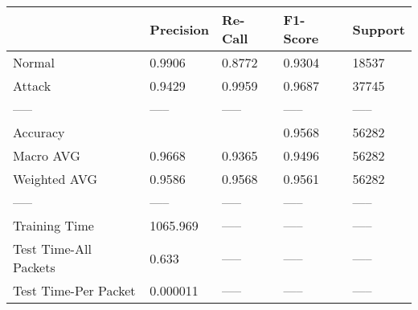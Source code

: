 \begin{tabular}{lllll}
\toprule
{} & Precision & Re-Call & F1-Score & Support \\
\midrule
Normal                &    0.9906 &  0.8772 &   0.9304 &   18537 \\
Attack                &    0.9429 &  0.9959 &   0.9687 &   37745 \\
-----                 &     ----- &   ----- &    ----- &   ----- \\
Accuracy              &           &         &   0.9568 &   56282 \\
Macro AVG             &    0.9668 &  0.9365 &   0.9496 &   56282 \\
Weighted AVG          &    0.9586 &  0.9568 &   0.9561 &   56282 \\
-----                 &     ----- &   ----- &    ----- &   ----- \\
Training Time         &  1065.969 &   ----- &    ----- &   ----- \\
Test Time-All Packets &     0.633 &   ----- &    ----- &   ----- \\
Test Time-Per Packet  &  0.000011 &   ----- &    ----- &   ----- \\
\bottomrule
\end{tabular}
